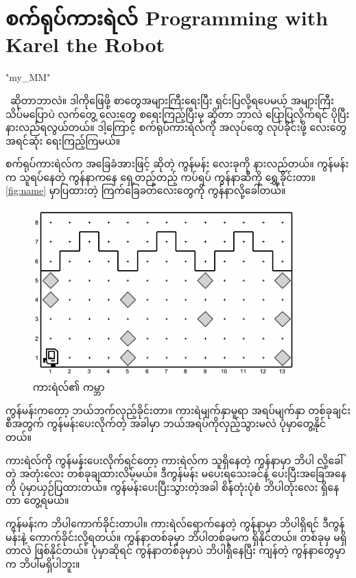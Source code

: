 \chapter{စက်ရုပ်ကားရဲလ် {} Programming with Karel the Robot}
\XeTeXlinebreaklocale "my_MM"  %
\begin{sloppypar}
\enprogramming\ ဆိုတာဘာလဲ။ ဒါကိုဖြေဖို့ စာတွေအများကြီးရေးပြီး ရှင်းပြလို့ရပေမယ့် အများကြီးသိပ်မပြောပဲ လက်တွေ့ \enprogram လေးတွေ စရေးကြည့်ပြီးမှ \mmprogramming ဆိုတာ ဘာလဲ ပြောပြလိုက်ရင် ပိုပြီးနားလည်ရလွယ်တယ်။ ဒါ့ကြောင့် စက်ရုပ်ကားရဲလ်ကို အလုပ်တွေ လုပ်ခိုင်းဖို့ \mmprogram လေးတွေ  အရင်ဆုံး ရေးကြည့်ကြမယ်။

စက်ရုပ်ကားရဲလ်က အခြေခံအားဖြင့်  ဆိုတဲ့ ကွန်မန်း လေးခုကို နားလည်တယ်။  ကွန်မန်းက သူရပ်နေတဲ့ ကွန်နာကနေ ရှေ့တည့်တည့် ကပ်ရပ် ကွန်နာဆီကို ရွှေ့ခိုင်းတာ။ \Fig \vref*{fig:name} မှာပြထားတဲ့ ကြက်ခြေခတ်လေးတွေကို ကွန်နာလို့ခေါ်တယ်။ 

\begin{figure}[!b]
    \centering\caption{ကားရဲလ်၏ {} ကမ္ဘာ}\label{fig:name}
    \includegraphics[width=4in]{ch01/ch01}
\end{figure}


 ကွန်မန်းကတော့ ဘယ်ဘက်လှည့်ခိုင်းတာ။ ကားရဲမျက်နှာမူရာ အရပ်မျက်နှာ တစ်ခုချင်းစီအတွက်  ကွန်မန်းပေးလိုက်တဲ့ အခါမှာ ဘယ်အရပ်ကိုလှည့်သွားမလဲ ပုံမှာတွေ့နိုင်တယ်။

ကားရဲလ်ကို  ကွန်မန်းပေးလိုက်ရင်တော့ ကားရဲလ်က သူရှိနေတဲ့ ကွန်နာမှာ ဘိပါ လို့ခေါ်တဲ့ အတုံးလေး တစ်ခုချထားလိမ့်မယ်။ ဒီကွန်မန်း မပေးရသေးခင်နဲ့ ပေးပြီးအခြေအနေကို ပုံမှာယှဉ်ပြထားတယ်။ ကွန်မန်းပေးပြီးသွားတဲ့အခါ စိန်တုံးပုံစံ ဘိပါတုံးလေး ရှိနေတာ တွေ့ရမယ်။ 

 ကွန်မန်းက ဘိပါကောက်ခိုင်းတာပါ။ ကားရဲလ်ရောက်နေတဲ့ ကွန်နာမှာ ဘိပါရှိရင် ဒီကွန်မန်းနဲ့ ကောက်ခိုင်းလို့ရတယ်။ ကွန်နာတစ်ခုမှာ ဘိပါတစ်ခုမက ရှိနိုင်တယ်။ တစ်ခုမှ မရှိတာလဲ ဖြစ်နိုင်တယ်။ ပုံမှာဆိုရင် ကွန်နာတစ်ခုမှာပဲ ဘိပါရှိနေပြီး ကျန်တဲ့ ကွန်နာတွေမှာက ဘိပါမရှိပါဘူး။


\end{sloppypar}
